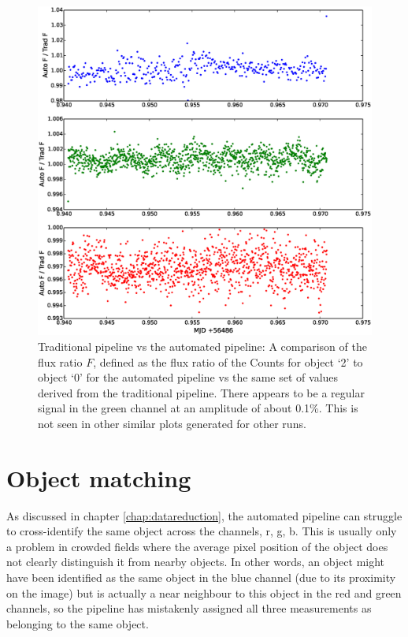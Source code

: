 \begin{figure}
\centering
\includegraphics[width=140mm]{images/ratio-of-ratios.eps}
\caption{Traditional pipeline vs the automated pipeline: A comparison of the flux ratio $F$, defined as the flux ratio of the Counts for object `2' to object `0' for the automated pipeline vs the same set of values derived from the traditional pipeline. There appears to be a regular signal in the green channel at an amplitude of about 0.1\%. This is not seen in other similar plots generated for other runs.}
\label{fig:ratio-of-ratios}
\end{figure}


\section{Object matching}
As discussed in chapter \ref{chap:datareduction}, the automated pipeline can struggle to cross-identify the same object across the channels, r, g, b. This is usually only a problem in crowded fields where the average pixel position of the object does not clearly distinguish it from nearby objects. In other words, an object might have been identified as the same object in the blue channel (due to its proximity on the image) but is actually a near neighbour to this object in the red and green channels, so the pipeline has mistakenly assigned all three measurements as belonging to the same object.

